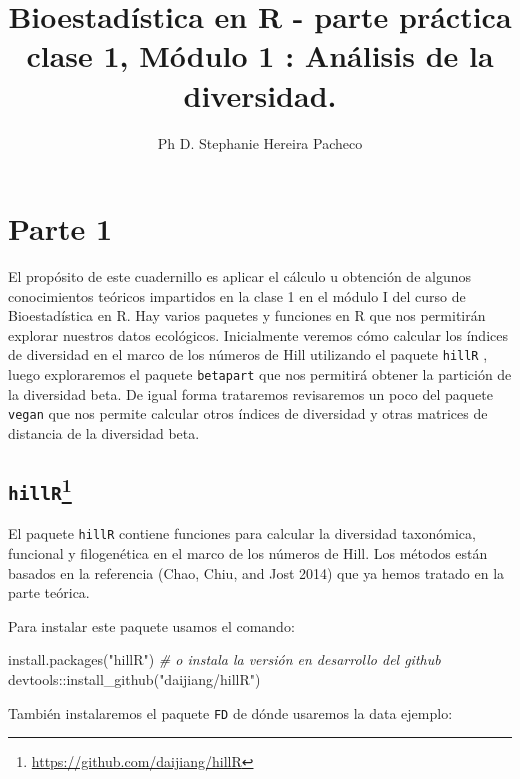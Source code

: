 \documentclass[
]{article}
\title{Bioestadística en R - parte práctica clase 1, Módulo 1 : Análisis
de la diversidad.}
\author{Ph D. Stephanie Hereira Pacheco}
\date{}
\newenvironment{Shaded}{\begin{snugshade}}{\end{snugshade}}
\newcommand{\CommentTok}[1]{\textcolor[rgb]{0.56,0.35,0.01}{\textit{#1}}}
\newcommand{\FunctionTok}[1]{\textcolor[rgb]{0.00,0.00,0.00}{#1}}
\newcommand{\NormalTok}[1]{#1}
\newcommand{\SpecialCharTok}[1]{\textcolor[rgb]{0.00,0.00,0.00}{#1}}
\newcommand{\StringTok}[1]{\textcolor[rgb]{0.31,0.60,0.02}{#1}}
\begin{document}
\maketitle

{
\setcounter{tocdepth}{3}
\tableofcontents
}
\hypertarget{parte-1}{%
\section{Parte 1}\label{parte-1}}

El propósito de este cuadernillo es aplicar el cálculo u obtención de
algunos conocimientos teóricos impartidos en la clase 1 en el módulo I
del curso de Bioestadística en R. Hay varios paquetes y funciones en R
que nos permitirán explorar nuestros datos ecológicos. Inicialmente
veremos cómo calcular los índices de diversidad en el marco de los
números de Hill utilizando el paquete \texttt{hillR} , luego
exploraremos el paquete \texttt{betapart} que nos permitirá obtener la
partición de la diversidad beta. De igual forma trataremos revisaremos
un poco del paquete \texttt{vegan} que nos permite calcular otros
índices de diversidad y otras matrices de distancia de la diversidad
beta.

\hypertarget{hillr1}{%
\subsection[\texttt{hillR}]{\texorpdfstring{\texttt{hillR}\footnote{\url{https://github.com/daijiang/hillR}}}{hillR}}\label{hillr1}}

El paquete \texttt{hillR} contiene funciones para calcular la diversidad
taxonómica, funcional y filogenética en el marco de los números de Hill.
Los métodos están basados en la referencia (Chao, Chiu, and Jost 2014)
que ya hemos tratado en la parte teórica.

Para instalar este paquete usamos el comando:

\begin{Shaded}
\begin{Highlighting}[]
\FunctionTok{install.packages}\NormalTok{(}\StringTok{"hillR"}\NormalTok{)}
\CommentTok{\# o instala la versión en desarrollo del github}
\NormalTok{devtools}\SpecialCharTok{::}\FunctionTok{install\_github}\NormalTok{(}\StringTok{"daijiang/hillR"}\NormalTok{)}
\end{Highlighting}
\end{Shaded}

También instalaremos el paquete \texttt{FD} de dónde usaremos la data
ejemplo:
\end{document}
